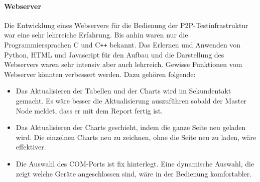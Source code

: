 \paragraph{Webserver}
Die Entwicklung eines Webservers für die Bedienung der P2P-Testinfrastruktur war eine sehr lehrreiche Erfahrung. Bis anhin waren nur die Programmiersprachen C und C\texttt{++} bekannt. Das Erlernen und Anwenden von Python, HTML und Javascript für den Aufbau und die Darstellung des Webservers waren sehr intensiv aber auch lehrreich. Gewisse Funktionen vom Webserver könnten verbessert werden. Dazu gehören folgende:

\begin{itemize}
	\item Das Aktualisieren der Tabellen und der Charts wird im Sekundentakt gemacht. Es wäre besser die Aktualisierung auszuführen sobald der Master Node meldet, dass er mit dem Report fertig ist.
	\item Das Aktualisieren der Charts geschieht, indem die ganze Seite neu geladen wird. Die einzelnen Charts neu zu zeichnen, ohne die Seite neu zu laden, wäre effektiver.
	\item Die Auswahl des COM-Ports ist fix hinterlegt. Eine dynamische Auswahl, die zeigt welche Geräte angeschlossen sind, wäre in der Bedienung komfortabler.
\end{itemize}


